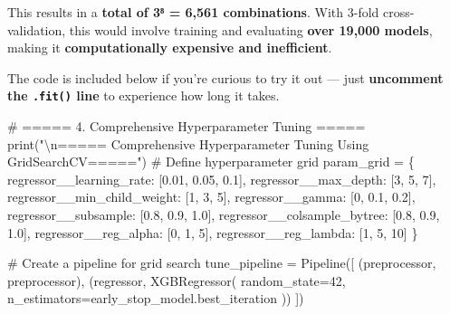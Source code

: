 \documentclass[
  letterpaper,
  DIV=11,
  numbers=noendperiod]{scrreprt}
\newenvironment{Shaded}{\begin{snugshade}}{\end{snugshade}}
\newcommand{\BuiltInTok}[1]{\textcolor[rgb]{0.00,0.23,0.31}{#1}}
\newcommand{\CharTok}[1]{\textcolor[rgb]{0.13,0.47,0.30}{#1}}
\newcommand{\CommentTok}[1]{\textcolor[rgb]{0.37,0.37,0.37}{#1}}
\newcommand{\DecValTok}[1]{\textcolor[rgb]{0.68,0.00,0.00}{#1}}
\newcommand{\FloatTok}[1]{\textcolor[rgb]{0.68,0.00,0.00}{#1}}
\newcommand{\NormalTok}[1]{\textcolor[rgb]{0.00,0.23,0.31}{#1}}
\newcommand{\OperatorTok}[1]{\textcolor[rgb]{0.37,0.37,0.37}{#1}}
\newcommand{\StringTok}[1]{\textcolor[rgb]{0.13,0.47,0.30}{#1}}
\begin{document}
This results in a \textbf{total of 3⁸ = 6,561 combinations}. With 3-fold
cross-validation, this would involve training and evaluating
\textbf{over 19,000 models}, making it \textbf{computationally expensive
and inefficient}.

The code is included below if you're curious to try it out --- just
\textbf{uncomment the \texttt{.fit()} line} to experience how long it
takes.

\begin{Shaded}
\begin{Highlighting}[]
\CommentTok{\# ===== 4. Comprehensive Hyperparameter Tuning =====}
\BuiltInTok{print}\NormalTok{(}\StringTok{"}\CharTok{\textbackslash{}n}\StringTok{===== Comprehensive Hyperparameter Tuning Using GridSearchCV====="}\NormalTok{)}
\CommentTok{\# Define hyperparameter grid}
\NormalTok{param\_grid }\OperatorTok{=}\NormalTok{ \{}
    \StringTok{\textquotesingle{}regressor\_\_learning\_rate\textquotesingle{}}\NormalTok{: [}\FloatTok{0.01}\NormalTok{, }\FloatTok{0.05}\NormalTok{, }\FloatTok{0.1}\NormalTok{],}
    \StringTok{\textquotesingle{}regressor\_\_max\_depth\textquotesingle{}}\NormalTok{: [}\DecValTok{3}\NormalTok{, }\DecValTok{5}\NormalTok{, }\DecValTok{7}\NormalTok{],}
    \StringTok{\textquotesingle{}regressor\_\_min\_child\_weight\textquotesingle{}}\NormalTok{: [}\DecValTok{1}\NormalTok{, }\DecValTok{3}\NormalTok{, }\DecValTok{5}\NormalTok{],}
    \StringTok{\textquotesingle{}regressor\_\_gamma\textquotesingle{}}\NormalTok{: [}\DecValTok{0}\NormalTok{, }\FloatTok{0.1}\NormalTok{, }\FloatTok{0.2}\NormalTok{],}
    \StringTok{\textquotesingle{}regressor\_\_subsample\textquotesingle{}}\NormalTok{: [}\FloatTok{0.8}\NormalTok{, }\FloatTok{0.9}\NormalTok{, }\FloatTok{1.0}\NormalTok{],}
    \StringTok{\textquotesingle{}regressor\_\_colsample\_bytree\textquotesingle{}}\NormalTok{: [}\FloatTok{0.8}\NormalTok{, }\FloatTok{0.9}\NormalTok{, }\FloatTok{1.0}\NormalTok{],}
    \StringTok{\textquotesingle{}regressor\_\_reg\_alpha\textquotesingle{}}\NormalTok{: [}\DecValTok{0}\NormalTok{, }\DecValTok{1}\NormalTok{, }\DecValTok{5}\NormalTok{],}
    \StringTok{\textquotesingle{}regressor\_\_reg\_lambda\textquotesingle{}}\NormalTok{: [}\DecValTok{1}\NormalTok{, }\DecValTok{5}\NormalTok{, }\DecValTok{10}\NormalTok{]}
\NormalTok{\}}

\CommentTok{\# Create a pipeline for grid search}
\NormalTok{tune\_pipeline }\OperatorTok{=}\NormalTok{ Pipeline([}
\NormalTok{    (}\StringTok{\textquotesingle{}preprocessor\textquotesingle{}}\NormalTok{, preprocessor),}
\NormalTok{    (}\StringTok{\textquotesingle{}regressor\textquotesingle{}}\NormalTok{, XGBRegressor(}
\NormalTok{        random\_state}\OperatorTok{=}\DecValTok{42}\NormalTok{,}
\NormalTok{        n\_estimators}\OperatorTok{=}\NormalTok{early\_stop\_model.best\_iteration}
\NormalTok{    ))}
\NormalTok{])}


\end{Highlighting}
\end{Shaded}
\end{document}
